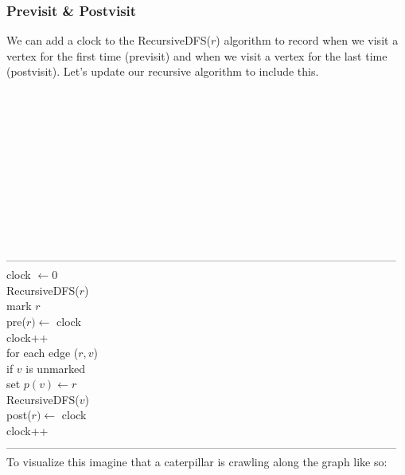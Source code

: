\documentclass{article}
\begin{document}
\subsubsection{Previsit \& Postvisit}
We can add a clock to the RecursiveDFS($r$) algorithm to record when we visit a vertex for the first time (previsit) and when we visit a vertex for the last time (postvisit). Let's update our recursive algorithm to include this.\\\\\\\\\\\\\\\\\\\\\\\\
---------------------------------------------------------------------------------------------------------
clock $\leftarrow 0$\\
RecursiveDFS($r$)\\
	\hspace*{7mm} mark $r$\\
	\hspace*{7mm} pre($r) \leftarrow$ clock\\
	\hspace*{7mm} clock++\\
	\hspace*{7mm} for each edge ($r, v$)\\
	\hspace*{14mm} if $v$ is unmarked\\
	\hspace*{21mm} set $p(v) \leftarrow r$\\
	\hspace*{21mm} RecursiveDFS($v$)\\
	\hspace*{7mm} post($r) \leftarrow$ clock\\
	\hspace*{7mm} clock++\\
---------------------------------------------------------------------------------------------------------\\
To visualize this imagine that a caterpillar is crawling along the graph like so:\\\\
\end{document}
